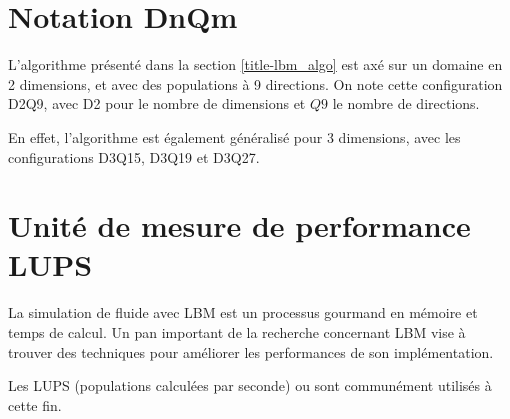 \section{Notation DnQm}
L'algorithme présenté dans la section \ref{title-lbm_algo} est axé sur un domaine en 2 dimensions, et avec des populations à 9 directions. On note cette configuration D2Q9, avec D2 pour le nombre de dimensions et $Q9$ le nombre de directions. 

En effet, l'algorithme est également généralisé pour 3 dimensions, avec les configurations D3Q15, D3Q19 et D3Q27.

\section{Unité de mesure de performance LUPS}

La simulation de fluide avec \acs{LBM} est un processus gourmand en mémoire et temps de calcul. Un pan important de la recherche concernant \acs{LBM} vise à trouver des techniques pour améliorer les performances de son implémentation.

Les \acl{LUPS} (populations calculées par seconde) ou \XLUPS{} sont communément utilisés à cette fin.
